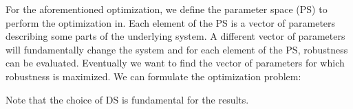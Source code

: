     For the aforementioned optimization, we define the parameter space (PS) to perform the optimization in. Each element of the PS is a vector of parameters describing some parts of the underlying system. A different vector of parameters will fundamentally change the system and for each element of the PS, robustness can be evaluated. Eventually we want to find the vector of parameters for which robustness is maximized. We can formulate the optimization problem:

    Note that the choice of DS is fundamental for the results. 










